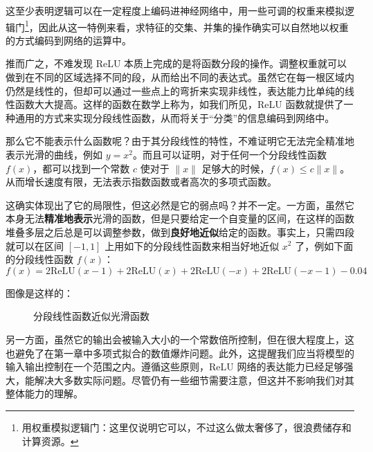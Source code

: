 这至少表明逻辑可以在一定程度上编码进神经网络中，用一些可调的权重来模拟逻辑门\footnote{用权重模拟逻辑门：这里仅说明它可以，不过这么做太奢侈了，很浪费储存和计算资源。}，因此从这一特例来看，求特征的交集、并集的操作确实可以自然地以权重的方式编码到网络的运算中。

推而广之，不难发现 ReLU 本质上完成的是将函数分段的操作。调整权重就可以做到在不同的区域选择不同的段，从而给出不同的表达式。虽然它在每一根区域内仍然是线性的，但却可以通过一些点上的弯折来实现非线性，表达能力比单纯的线性函数大大提高。这样的函数在数学上称为，如我们所见，ReLU 函数就提供了一种通用的方式来实现分段线性函数，从而将关于“分类”的信息编码到网络中。

那么它不能表示什么函数呢？由于其分段线性的特性，不难证明它无法完全精准地表示光滑的曲线，例如 $y = x^2$。而且可以证明，对于任何一个分段线性函数 $f(x)$，都可以找到一个常数 $c$ 使对于 $\|x\|$ 足够大的时候，$f(x) \leq c\|x\|$。从而增长速度有限，无法表示指数函数或者高次的多项式函数。

这确实体现出了它的局限性，但这必然是它的弱点吗？并不一定。一方面，虽然它本身无法\textbf{精准地表示}光滑的函数，但是只要给定一个自变量的区间，在这样的函数堆叠多层之后总是可以调整参数，做到\textbf{良好地近似}给定的函数。事实上，只需四段就可以在区间 $[-1, 1]$ 上用如下的分段线性函数来相当好地近似 $x^2$ 了，例如下面的分段线性函数 $f(x)$：
\[
    f(x) = 2\text{ReLU}(x-1) + 2\text{ReLU}(x) + 2\text{ReLU}(-x) + 2\text{ReLU}(-x-1) - 0.04 
\]

图像是这样的：
\begin{figure}[H]
\centering
{}
\caption{分段线性函数近似光滑函数}
\end{figure}

另一方面，虽然它的输出会被输入大小的一个常数倍所控制，但在很大程度上，这也避免了在第一章中多项式拟合的数值爆炸问题。此外，这提醒我们应当将模型的输入输出控制在一个范围之内。遵循这些原则，ReLU 网络的表达能力已经足够强大，能解决大多数实际问题。尽管仍有一些细节需要注意，但这并不影响我们对其整体能力的理解。

